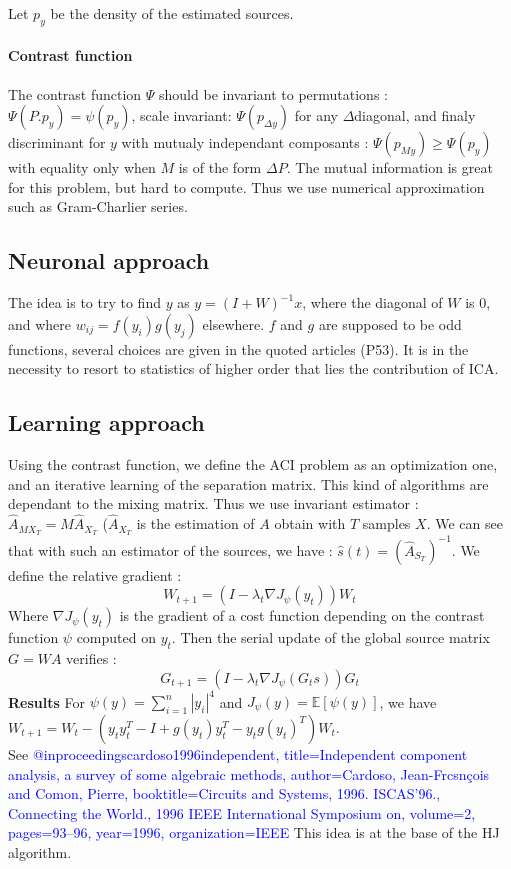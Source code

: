 \documentclass[a4paper,11pt,titlepage]{article}
\begin{document}
Let $p_y$ be the density of the estimated sources.
\paragraph{Contrast function} The contrast function $\Psi$ should be invariant to permutations : $\Psi(P.p_y) = \psi(p_y)$, scale invariant: $\Psi(p_{\Delta y})$ for any $\Delta$diagonal, and finaly discriminant for $y$ with mutualy independant composants : $\Psi(p_{My}) \geq \Psi(p_y)$ with equality only when $M$ is of the form $\Delta P$.
The mutual information is great for this problem, but hard to compute. Thus we use numerical approximation such as Gram-Charlier series.

\subsection{Neuronal approach}
The idea is to try to find $y$ as $y = (I+W)^{-1}x$, where the diagonal of $W$ is 0, and where $w_{ij} = f(y_i)g(y_j)$ elsewhere. $f$ and $g$ are supposed to be odd functions, several choices are given in the quoted articles (P53).
It is in the necessity to resort to statistics of higher order that lies the contribution of ICA.

\subsection{Learning approach}
Using the contrast function, we define the ACI problem as an optimization one, and an iterative learning of the separation matrix. This kind of algorithms are dependant to the mixing matrix. Thus we use invariant estimator : $\hat{A}_{MX_T}=M\hat{A}_{X_T}$ ($\hat{A}_{X_T}$ is the estimation of $A$ obtain with $T$ samples $X$. We can see that with such an estimator of the sources, we have : $\hat{s}(t) = (\hat{A}_{S_T})^{-1}$.
We define the relative gradient :
\begin{equation*}
	W_{t+1} = (I - \lambda_t\nabla J_\psi(y_t))W_t
\end{equation*}
Where $\nabla J_\psi(y_t)$ is the gradient of a cost function depending on the contrast function $\psi$ computed on $y_t$. Then the serial update of the global source matrix $G =WA$ verifies :
\begin{equation*}
	G_{t+1} = (I - \lambda_t\nabla J_\psi(G_ts))G_t
\end{equation*}
\textbf{Results} For $\psi(y) = \sum\limits_{i=1}^n |y_i|^4$ and $J_\psi(y) = \mathds{E}[\psi(y)]$, we have $W_{t+1} = W_t -(y_t y_t^T-I+g(y_t)y_t^T- y_t g(y_t)^T)W_t$. \\
See \textcolor{blue}{@inproceedings{cardoso1996independent,
	  title={Independent component analysis, a survey of some algebraic methods},
	    author={Cardoso, Jean-Frcsn{\c{c}}ois and Comon, Pierre},
		  booktitle={Circuits and Systems, 1996. ISCAS'96., Connecting the World., 1996 IEEE International Symposium on},
		    volume={2},
			  pages={93--96},
			    year={1996},
				  organization={IEEE}
			  }
}
This idea is at the base of the HJ algorithm.
\end{document}
